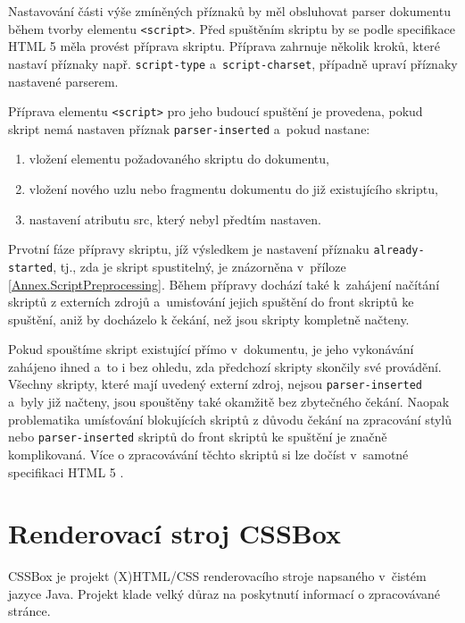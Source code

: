 Nastavování části výše zmíněných příznaků by měl obsluhovat parser dokumentu během tvorby elementu \texttt{<script>}. Před spuštěním skriptu by se podle specifikace HTML 5 měla provést příprava skriptu. Příprava zahrnuje několik kroků, které nastaví příznaky např. \texttt{script-type} a~\texttt{script-charset}, případně upraví příznaky nastavené parserem. 

Příprava elementu \texttt{<script>} pro jeho budoucí spuštění je provedena, pokud skript nemá nastaven příznak \texttt{parser-inserted} a~pokud nastane:

\begin{enumerate}
  \item vložení elementu požadovaného skriptu do dokumentu,
  \item vložení nového uzlu nebo fragmentu dokumentu do již existujícího skriptu,
  \item nastavení atributu src, který nebyl předtím nastaven.
\end{enumerate}

Prvotní fáze přípravy skriptu, jíž výsledkem je nastavení příznaku \texttt{already-started}, tj., zda je skript spustitelný, je znázorněna v~příloze \ref{Annex.ScriptPreprocessing}. Během přípravy dochází také k~zahájení načítání skriptů z externích zdrojů a~umisťování jejich spuštění do front skriptů ke spuštění, aniž by docházelo k čekání, než jsou skripty kompletně načteny. 

Pokud spouštíme skript existující přímo v~dokumentu, je jeho vykonávání zahájeno ihned a~to i bez ohledu, zda předchozí skripty skončily své provádění. Všechny skripty, které mají uvedený externí zdroj, nejsou \texttt{parser-inserted} a~byly již načteny, jsou spouštěny také okamžitě bez zbytečného čekání. Naopak problematika umísťování blokujících skriptů z důvodu čekání na zpracování stylů nebo \texttt{parser-inserted} skriptů do front skriptů ke spuštění je značně komplikovaná. Více o zpracovávání těchto skriptů si lze dočíst v~samotné specifikaci HTML 5 \cite{Bibliography.HTML5.Scripting}.

\section{Renderovací stroj CSSBox}
\label{Chapter.DependenciesAnalysis.CSSBox}

CSSBox je projekt (X)HTML/CSS renderovacího stroje napsaného v~čistém jazyce Java. Projekt klade velký důraz na poskytnutí informací o zpracovávané stránce.

